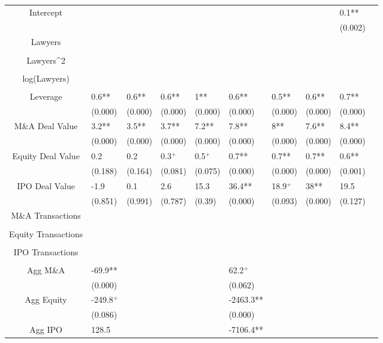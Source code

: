 \documentclass{article}
\begin{document}
\begin{table}[H]
\begin{tabular}{|clllllllll|}
Intercept &  &  &  &  &  &  &  & 0.1** & \\ 
   &  &  &  &  &  &  &  & (0.002) & \\ 
  Lawyers &  &  &  &  &  &  &  &  & \\ 
   &  &  &  &  &  &  &  &  & \\ 
  Lawyers^2 &  &  &  &  &  &  &  &  & \\ 
   &  &  &  &  &  &  &  &  & \\ 
  log(Lawyers) &  &  &  &  &  &  &  &  & \\ 
   &  &  &  &  &  &  &  &  & \\ 
  Leverage & 0.6** & 0.6** & 0.6** & 1** & 0.6** & 0.5** & 0.6** & 0.7** & \\ 
   & (0.000) & (0.000) & (0.000) & (0.000) & (0.000) & (0.000) & (0.000) & (0.000) & \\ 
  M\&A Deal Value & 3.2** & 3.5** & 3.7** & 7.2** & 7.8** & 8** & 7.6** & 8.4** & \\ 
   & (0.000) & (0.000) & (0.000) & (0.000) & (0.000) & (0.000) & (0.000) & (0.000) & \\ 
  Equity Deal Value & 0.2 & 0.2 & 0.3$^{+}$ & 0.5$^{+}$ & 0.7** & 0.7** & 0.7** & 0.6** & \\ 
   & (0.188) & (0.164) & (0.081) & (0.075) & (0.000) & (0.000) & (0.000) & (0.001) & \\ 
  IPO Deal Value & -1.9 & 0.1 & 2.6 & 15.3 & 36.4** & 18.9$^{+}$ & 38** & 19.5 & \\ 
   & (0.851) & (0.991) & (0.787) & (0.39) & (0.000) & (0.093) & (0.000) & (0.127) & \\ 
  M\&A Transactions &  &  &  &  &  &  &  &  & \\ 
   &  &  &  &  &  &  &  &  & \\ 
  Equity Transactions &  &  &  &  &  &  &  &  & \\ 
   &  &  &  &  &  &  &  &  & \\ 
  IPO Transactions &  &  &  &  &  &  &  &  & \\ 
   &  &  &  &  &  &  &  &  & \\ 
  Agg M\&A & -69.9** &  &  &  & 62.2$^{+}$ &  &  &  & \\ 
   & (0.000) &  &  &  & (0.062) &  &  &  & \\ 
  Agg Equity & -249.8$^{+}$ &  &  &  & -2463.3** &  &  &  & \\ 
   & (0.086) &  &  &  & (0.000) &  &  &  & \\ 
  Agg IPO & 128.5 &  &  &  & -7106.4** &  &  &  & \\ 

\end{tabular}
\end{table}
\end{document}
